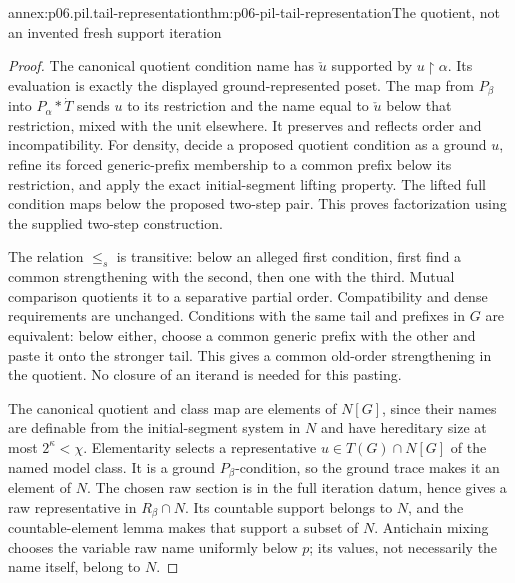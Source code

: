 \begin{annexitem}{annex:p06.pil.tail-representation}{thm:p06-pil-tail-representation}{The quotient, not an invented fresh support iteration}
\begin{proof}
The canonical quotient condition name has \(\check u\) supported by
\(u\mathbin{\upharpoonright}\alpha\). Its evaluation is exactly the
displayed ground-represented poset. The map from \(P_\beta\) into
\(P_\alpha*\dot T\) sends \(u\) to its restriction and the name
equal to \(\check u\) below that restriction, mixed with the unit
elsewhere. It preserves and reflects order and incompatibility. For
density, decide a proposed quotient condition as a ground \(u\), refine
its forced generic-prefix membership to a common prefix below its
restriction, and apply the exact initial-segment lifting property.
The lifted full condition maps below the proposed two-step pair. This
proves factorization using the supplied two-step construction.

The relation \(\leq_s\) is transitive: below an alleged first condition,
first find a common strengthening with the second, then one with the
third. Mutual comparison quotients it to a separative partial order.
Compatibility and dense requirements are unchanged. Conditions with
the same tail and prefixes in \(G\) are equivalent: below either,
choose a common generic prefix with the other and paste it onto the
stronger tail. This gives a common old-order strengthening in the
quotient. No closure of an iterand is needed for this pasting.

The canonical quotient and class map are elements of \(N[G]\), since
their names are definable from the initial-segment system in \(N\)
and have hereditary size at most \(2^\kappa<\chi\).
Elementarity selects a representative \(u\in T(G)\cap N[G]\)
of the named model class. It is a ground \(P_\beta\)-condition,
so the ground trace makes it an element of \(N\). The chosen raw
section is in the full iteration datum, hence gives a raw representative
in \(R_\beta\cap N\). Its countable support belongs to \(N\),
and the countable-element lemma makes that support a subset of \(N\).
Antichain mixing chooses the variable raw name uniformly below \(p\);
its values, not necessarily the name itself, belong to \(N\).
\end{proof}
\end{annexitem}

